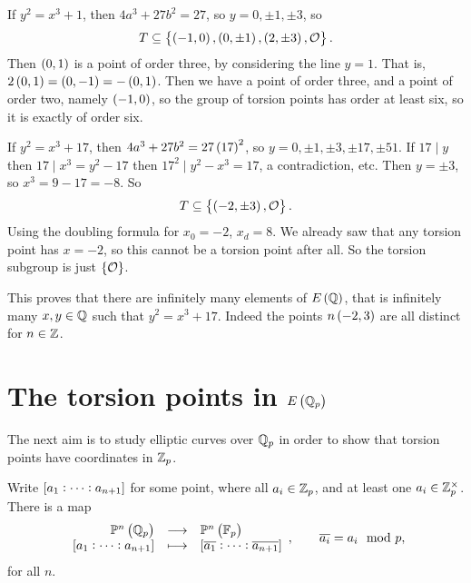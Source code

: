 \begin{example}
If $ y^2 = x^3 + 1 $, then $ 4a^3 + 27b^2 = 27 $, so $ y = 0, \pm 1, \pm 3 $, so
$$ T \subseteq \cbr{\br{-1, 0}, \br{0, \pm 1}, \br{2, \pm 3}, \OOO}. $$
Then $ \br{0, 1} $ is a point of order three, by considering the line $ y = 1 $. That is, $ 2\br{0, 1} = \br{0, -1} = -\br{0, 1} $. Then we have a point of order three, and a point of order two, namely $ \br{-1, 0} $, so the group of torsion points has order at least six, so it is exactly of order six.
\end{example}

\begin{example}
If $ y^2 = x^3 + 17 $, then $ 4a^3 + 27b^2 = 27\br{17}^2 $, so $ y = 0, \pm 1, \pm 3, \pm 17, \pm 51 $. If $ 17 \mid y $ then $ 17 \mid x^3 = y^2 - 17 $ then $ 17^2 \mid y^2 - x^3 = 17 $, a contradiction, etc. Then $ y = \pm 3 $, so $ x^3 = 9 - 17 = -8 $. So
$$ T \subseteq \cbr{\br{-2, \pm 3}, \OOO}. $$
Using the doubling formula for $ x_0 = -2 $, $ x_d = 8 $. We already saw that any torsion point has $ x = -2 $, so this cannot be a torsion point after all. So the torsion subgroup is just $ \cbr{\OOO} $.
\end{example}

\begin{remark*}
This proves that there are infinitely many elements of $ E\br{\QQ} $, that is infinitely many $ x, y \in \mathbb{Q} $ such that $ y^2 = x^3 + 17 $. Indeed the points $ n\br{-2, 3} $ are all distinct for $ n \in \mathbb{Z} $.
\end{remark*}

\pagebreak

\section{The torsion points in \texorpdfstring{$ E\br{\QQ_p} $}{E(Qp)}}


The next aim is to study elliptic curves over $ \mathbb{Q}_p $ in order to show that torsion points have coordinates in $ \mathbb{Z}_p $.

\begin{definition}
Write $ \sbr{a_1 : \dots : a_{n + 1}} $ for some point, where all $ a_i \in \mathbb{Z}_p $, and at least one $ a_i \in \mathbb{Z}_p^\times $. There is a map
$$ \function{\PP^n\br{\QQ_p}}{\PP^n\br{\FF_p}}{\sbr{a_1 : \dots : a_{n + 1}}}{\sbr{\overline{a_1} : \dots : \overline{a_{n + 1}}}}, \qquad \overline{a_i} = a_i \mod p, $$
for all $ n $.
\end{definition}

